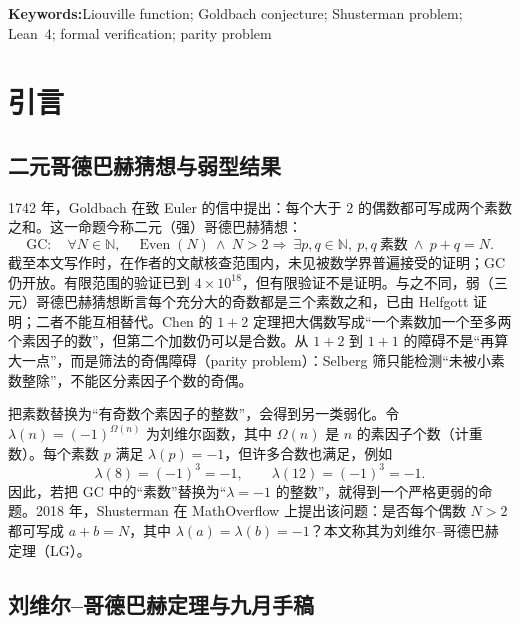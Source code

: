 \documentclass[11pt,a4paper]{ctexart}
\theoremstyle{plain}
\theoremstyle{definition}
\newcommand{\N}{\mathbb{N}}
\newcommand{\li}{\lambda}
\newcommand{\Om}{\Omega}
\newcommand{\Even}{\operatorname{Even}}
\newcommand{\GC}{\mathrm{GC}}
\begin{document}
\vspace{0.4em}
\noindent\textbf{Keywords:}Liouville function; Goldbach conjecture; Shusterman problem; Lean~4; formal verification; parity problem

\newpage
\section{引言}
\label{sec:intro}

\subsection{二元哥德巴赫猜想与弱型结果}
\label{sec:bg}

1742 年，Goldbach 在致 Euler 的信中提出：每个大于 $2$ 的偶数都可写成两个素数之和\cite{goldbach1742}。这一命题今称二元（强）哥德巴赫猜想：
\begin{equation}
\GC:\quad \forall N\in\N,\quad \Even(N)\ \land\ N>2
\Longrightarrow\ \exists p,q\in\N,\ p,q\ \text{素数}\ \land\ p+q=N.
\label{eq:gc}
\end{equation}
截至本文写作时，在作者的文献核查范围内，未见被数学界普遍接受的证明；GC 仍开放。有限范围的验证已到 \(4\times10^{18}\)\cite{oliveira2014}，但有限验证不是证明。与之不同，弱（三元）哥德巴赫猜想断言每个充分大的奇数都是三个素数之和，已由 Helfgott 证明\cite{helfgott2015}；二者不能互相替代。Chen 的 $1+2$ 定理\cite{chen1973,chen1978}把大偶数写成“一个素数加一个至多两个素因子的数”，但第二个加数仍可以是合数。从 $1+2$ 到 $1+1$ 的障碍不是“再算大一点”，而是筛法的奇偶障碍（parity problem）：Selberg 筛只能检测“未被小素数整除”，不能区分素因子个数的奇偶\cite{montgomeryvaughan}。

把素数替换为“有奇数个素因子的整数”，会得到另一类弱化。令 $\li(n)=(-1)^{\Om(n)}$ 为刘维尔函数，其中 $\Om(n)$ 是 $n$ 的素因子个数（计重数）。每个素数 $p$ 满足 $\li(p)=-1$，但许多合数也满足，例如
\[
  \li(8)=(-1)^3=-1,\qquad \li(12)=(-1)^3=-1.
\]
因此，若把 GC 中的“素数”替换为“$\li=-1$ 的整数”，就得到一个严格更弱的命题。2018 年，Shusterman 在 MathOverflow 上提出该问题\cite{shusterman2018}：是否每个偶数 $N>2$ 都可写成 $a+b=N$，其中 $\li(a)=\li(b)=-1$？本文称其为刘维尔--哥德巴赫定理（LG）。

\subsection{刘维尔--哥德巴赫定理与九月手稿}
\label{sec:lg-background}
\end{document}
